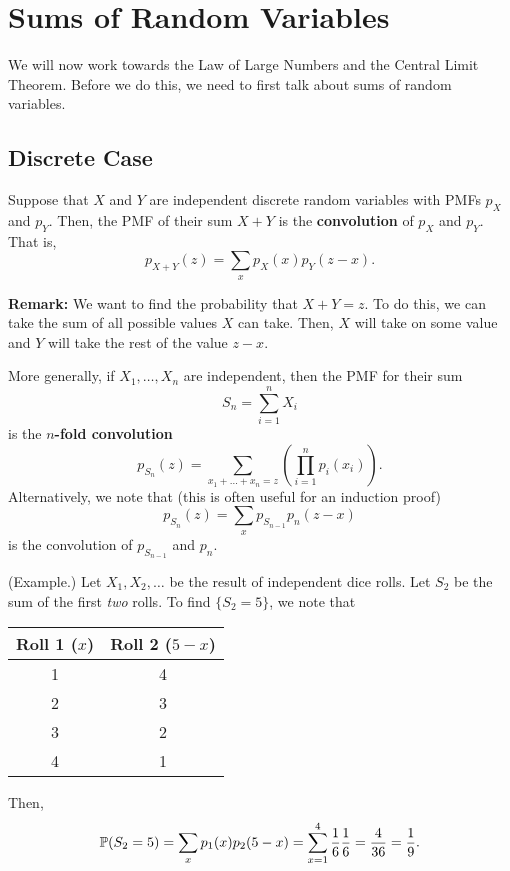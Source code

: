 \section{Sums of Random Variables}
We will now work towards the Law of Large Numbers and the Central Limit Theorem. Before we do this, we need to first talk about sums of random variables.

\subsection{Discrete Case}
\begin{theorem}{}{}
    Suppose that $X$ and $Y$ are independent discrete random variables with PMFs $p_X$ and $p_Y$. Then, the PMF of their sum $X + Y$ is the \textbf{convolution} of $p_X$ and $p_Y$. That is, 
    \[p_{X + Y}(z) = \sum_x p_{X}(x) p_{Y}(z - x).\]
\end{theorem}
\textbf{Remark:} We want to find the probability that $X + Y = z$. To do this, we can take the sum of all possible values $X$ can take. Then, $X$ will take on some value and $Y$ will take the rest of the value $z - x$. 

\bigskip 

More generally, if $X_1, \dots, X_n$ are independent, then the PMF for their sum 
\[S_n = \sum_{i = 1}^{n} X_i\]
is the \textbf{$n$-fold convolution}
\[p_{S_n}(z) = \sum_{x_1 + \dots + x_n = z} \left(\prod_{i = 1}^{n} p_{i}(x_i)\right).\]
Alternatively, we note that (this is often useful for an induction proof)
\[p_{S_n}(z) = \sum_{x} p_{S_{n - 1}} p_{n}(z - x)\]
is the convolution of $p_{S_{n - 1}}$ and $p_n$.

\begin{mdframed}[]
    (Example.) Let $X_1, X_2, \dots$ be the result of independent dice rolls. Let $S_2$ be the sum of the first \emph{two} rolls. To find $\{S_2 = 5\}$, we note that 
    \begin{center}
        \begin{tabular}{||c|c||}
            \hline 
            Roll 1 ($x$) & Roll 2 ($5 - x$) \\ 
            \hline \hline 
            1 & 4 \\ 
            2 & 3 \\ 
            3 & 2 \\ 
            4 & 1 \\ 
            \hline 
        \end{tabular}
    \end{center}
    Then, 
    \[\mathbb{P}(S_2 = 5) = \sum_{x} p_{1}(x) p_{2}(5 - x) = \sum_{x = 1}^{4} \frac{1}{6} \frac{1}{6} = \frac{4}{36} = \frac{1}{9}.\]
\end{mdframed}

